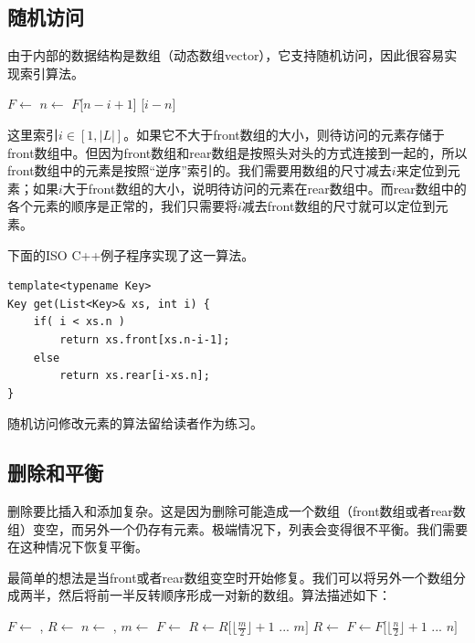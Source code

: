 \documentclass[b5paper]{ctexart}
\begin{document}
\subsection{随机访问}
由于内部的数据结构是数组（动态数组vector），它支持随机访问，因此很容易实现索引算法。

\begin{algorithmic}
  \State $F \gets $ 
  \State $n \gets $ 
    \State \Return $F$[$n-i+1$]
  \Else
    \State \Return {}[$i-n$]
  \EndIf
\EndFunction
\end{algorithmic}

这里索引$i \in [1, |L|]$。如果它不大于front数组的大小，则待访问的元素存储于front数组中。但因为front数组和rear数组是按照头对头的方式连接到一起的，所以front数组中的元素是按照“逆序”索引的。我们需要用数组的尺寸减去$i$来定位到元素；如果$i$大于front数组的大小，说明待访问的元素在rear数组中。而rear数组中的各个元素的顺序是正常的，我们只需要将$i$减去front数组的尺寸就可以定位到元素。

下面的ISO C++例子程序实现了这一算法。

\begin{lstlisting}
template<typename Key>
Key get(List<Key>& xs, int i) {
    if( i < xs.n )
        return xs.front[xs.n-i-1];
    else
        return xs.rear[i-xs.n];
}
\end{lstlisting}

随机访问修改元素的算法留给读者作为练习。

\subsection{删除和平衡}
删除要比插入和添加复杂。这是因为删除可能造成一个数组（front数组或者rear数组）变空，而另外一个仍存有元素。极端情况下，列表会变得很不平衡。我们需要在这种情况下恢复平衡。

最简单的想法是当front或者rear数组变空时开始修复。我们可以将另外一个数组分成两半，然后将前一半反转顺序形成一对新的数组。算法描述如下：

\begin{algorithmic}
  \State $F \gets$ , $R \gets$ 
  \State $n \gets$ , $m \gets$ 
    \State $F \gets$ 
    \State $R \gets R[\lfloor \frac{m}{2} \rfloor + 1$ ... $m]$
    \State $R \gets$ 
    \State $F \gets F[\lfloor \frac{n}{2} \rfloor + 1$ ... $n]$
  \EndIf
\EndFunction
\end{algorithmic}
\end{document}
